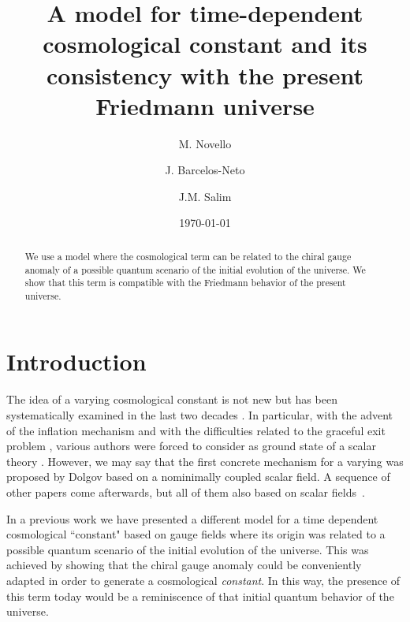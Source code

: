 \documentclass[a4paper,twocolumn,prd,superscriptaddress,nofootinbib,showpacs]
{revtex4}
\begin{document}
\title{A model for time-dependent cosmological constant and its
consistency with the present Friedmann universe}

\author{M. Novello}
\author{J. Barcelos-Neto}
\author{J.M. Salim}

\date{\today}

\begin{abstract}
We use a model where the cosmological term can be related to the
chiral gauge anomaly of a possible quantum scenario of the initial
evolution of the universe. We show that this term is compatible with
the Friedmann behavior of the present universe.
\end{abstract}


\maketitle

\section{Introduction}
The idea of a varying cosmological constant is not new but has been
systematically examined in the last two decades \cite{Overduin}. In
particular, with the advent of the inflation mechanism and with the
difficulties related to the graceful exit problem \cite{Kaloper},
various authors were forced to consider \myHighlight{$\Lambda$}\coordHE{} as ground state of a
scalar theory \cite{Ellis}. However, we may say that the first
concrete mechanism for a varying \myHighlight{$\Lambda$}\coordHE{} was proposed by Dolgov
\cite{Dolgov} based on a nominimally coupled scalar field. A sequence
of other papers come afterwards, but all of them also based on scalar
fields~\cite{Ozer}.

\medskip
In a previous work \cite{Novello} we have presented a different model
for a time dependent cosmological ``constant" based on gauge fields
where its origin was related to a possible quantum scenario of the
initial evolution of the universe. This was achieved by showing that
the chiral gauge anomaly could be conveniently adapted in order to
generate a cosmological {\it constant}. In this way, the presence of
this term today would be a reminiscence of that initial quantum
behavior of the universe.
\end{document}
